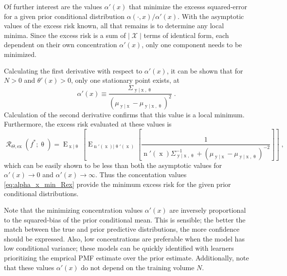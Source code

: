 \documentclass[12pt]{report}
\DeclareMathOperator{\xrm}{\mathrm{x}}
\DeclareMathOperator{\yrm}{\mathrm{y}}
\DeclareMathOperator{\nrm}{\mathrm{n}}
\DeclareMathOperator{\Erm}{\mathrm{E}}
\DeclareMathOperator{\Xcal}{\mathcal{X}}
\DeclareMathOperator{\Rcal}{\mathcal{R}}
\begin{document}
Of further interest are the values $\alpha'(x)$ that minimize the excesss squared-error for a given prior conditional distribution $\alpha(\cdot,x) / \alpha'(x)$. With the asymptotic values of the excess risk known, all that remains is to determine any local minima. Since the excess risk is a sum of $|\Xcal|$ terms of identical form, each dependent on their own concentration $\alpha'(x)$, only one component needs to be minimized. 

Calculating the first derivative with respect to $\alpha'(x)$, it can be shown that for $N > 0$ and $\theta'(x) > 0$, only one stationary point exists, at 
\begin{equation} \label{eq:alpha_x_min_Rex}
\alpha'(x) \equiv \frac{\Sigma_{\yrm | \xrm,\uptheta}}{\left( \mu_{\yrm | \xrm} - \mu_{\yrm | \xrm,\uptheta} \right)^2} \;.
\end{equation}
Calculation of the second derivative confirms that this value is a local minimum. Furthermore, the excess risk evaluated at these values is 
\begin{equation}
\Rcal_{\Theta, \mathrm{ex}}(f^* ; \uptheta) = \Erm_{\xrm | \uptheta}\left[ \Erm_{\nrm'(\xrm) | \uptheta'(\xrm)}\left[ \frac{1}{\nrm'(\xrm)\Sigma_{\yrm | \xrm,\uptheta}^{-1} + \left( \mu_{\yrm | \xrm} - \mu_{\yrm | \xrm,\uptheta} \right)^{-2}} \right] \right] \;,
\end{equation}
which can be easily shown to be less than both the asymptotic values for $\alpha'(x) \to 0$ and $\alpha'(x) \to \infty$. Thus the concentation values \eqref{eq:alpha_x_min_Rex} provide the minimum excess risk for the given prior conditional distributions.

Note that the minimizing concentration values $\alpha'(x)$ are inversely proportional to the squared-bias of the prior conditional mean. This is sensible; the better the match between the true and prior predictive distributions, the more confidence should be expressed. Also, low concentrations are preferable when the model has low conditional variance; these models can be quickly identified with learners prioritizing the emprical PMF estimate over the prior estimate. Additionally, note that these values $\alpha'(x)$ do not depend on the training volume $N$.
\end{document}
